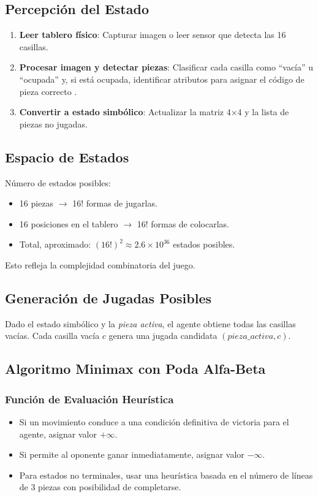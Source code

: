 \documentclass[conference]{IEEEtran}
\begin{document}
\subsection{Percepción del Estado}

\begin{enumerate}
\item \textbf{Leer tablero físico}: Capturar imagen o leer sensor que detecta las 16 casillas.
\item \textbf{Procesar imagen y detectar piezas}: Clasificar cada casilla como ``vacía'' u ``ocupada'' y, si está ocupada, identificar atributos para asignar el código de pieza correcto \cite{muller2009}.
\item \textbf{Convertir a estado simbólico}: Actualizar la matriz 4×4 y la lista de piezas no jugadas.
\end{enumerate}

\subsection{Espacio de Estados}

Número de estados posibles:

	\begin{itemize}
		\item 16 piezas $\rightarrow$ 16! formas de jugarlas.
		\item 16 posiciones en el tablero $\rightarrow$ 16! formas de colocarlas.
		\item Total, aproximado: $(16!)^2 \approx 2.6 \times 10^{36}$ estados posibles.
	\end{itemize}

Esto refleja la complejidad combinatoria del juego.

\subsection{Generación de Jugadas Posibles}

Dado el estado simbólico y la \textit{pieza activa}, el agente obtiene todas las casillas vacías. Cada casilla vacía $c$ genera una jugada candidata $(pieza\_activa, c)$.

\subsection{Algoritmo Minimax con Poda Alfa-Beta}

\subsubsection{Función de Evaluación Heurística}
\begin{itemize}
\item Si un movimiento conduce a una condición definitiva de victoria para el agente, asignar valor $+\infty$.
\item Si permite al oponente ganar inmediatamente, asignar valor $-\infty$.
\item Para estados no terminales, usar una heurística basada en el número de líneas de 3 piezas con posibilidad de completarse.
\end{itemize}
\end{document}
